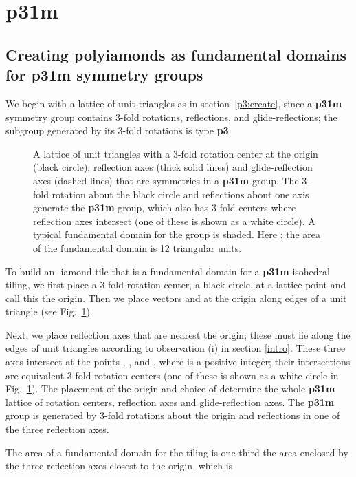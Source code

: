 \documentclass{ws-ijcga}
\begin{document}
\section{{\bf p31m}}
\label{p31m}
\subsection{Creating polyiamonds as fundamental domains for {\bf p31m} symmetry groups}
\label{p31m:create}
We begin with a lattice of unit triangles as in section~\ref{p3:create}, 
since a {\bf p31m} symmetry group contains 3-fold rotations, reflections, and glide-reflections; 
the subgroup generated by its 3-fold rotations is type {\bf p3}. 
\begin{figure}[h]
\centerline{
}
\vspace*{8pt}
\caption{
A lattice of unit triangles with a 3-fold rotation center at the origin (black circle), reflection axes 
(thick solid lines) and glide-reflection axes (dashed lines) that are symmetries in a {\bf p31m} group. 
The 3-fold rotation about the
black circle and reflections about one axis generate the {\bf p31m} group, 
which also has 3-fold centers where reflection
axes intersect (one of these is shown as a white circle). 
A typical fundamental domain for the group is shaded. 
Here ; the area of the fundamental domain is 12 triangular units.
\label{fig:p31m}
}
\end{figure}
To build an -iamond tile that is a fundamental domain for a {\bf p31m} isohedral tiling,
we first place a 3-fold rotation center, a black circle, at a lattice point and call this the origin.
Then we place vectors  and  at the origin along edges of a unit triangle (see Fig.~\ref{fig:p31m}). 

Next, we place reflection axes that are nearest the origin; 
these must lie along the edges of
unit triangles according to observation (i) in section \ref{intro}. 
These three axes intersect at the points
, , and , 
where  is a positive integer; 
their intersections are equivalent 3-fold rotation centers 
(one of these is shown as a white circle in Fig.~\ref{fig:p31m}). 
The placement of the origin and choice of  determine the whole {\bf p31m} lattice of 
rotation centers, reflection axes and glide-reflection axes. 
The {\bf p31m} group  is generated by 3-fold rotations about the origin and
reflections in one of the three reflection axes.

The area  of a fundamental domain for the tiling is one-third the area enclosed by the
three reflection axes closest to the origin, which is
\end{document}
